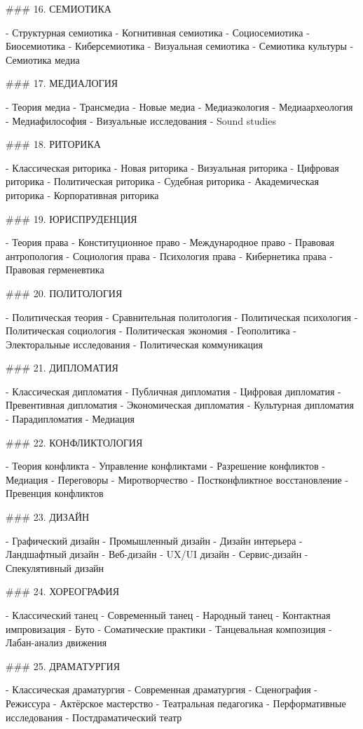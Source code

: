 ### 16. СЕМИОТИКА

- Структурная семиотика
- Когнитивная семиотика
- Социосемиотика
- Биосемиотика
- Киберсемиотика
- Визуальная семиотика
- Семиотика культуры
- Семиотика медиа

### 17. МЕДИАЛОГИЯ

- Теория медиа
- Трансмедиа
- Новые медиа
- Медиаэкология
- Медиаархеология
- Медиафилософия
- Визуальные исследования
- Sound studies

### 18. РИТОРИКА

- Классическая риторика
- Новая риторика
- Визуальная риторика
- Цифровая риторика
- Политическая риторика
- Судебная риторика
- Академическая риторика
- Корпоративная риторика

### 19. ЮРИСПРУДЕНЦИЯ

- Теория права
- Конституционное право
- Международное право
- Правовая антропология
- Социология права
- Психология права
- Кибернетика права
- Правовая герменевтика

### 20. ПОЛИТОЛОГИЯ

- Политическая теория
- Сравнительная политология
- Политическая психология
- Политическая социология
- Политическая экономия
- Геополитика
- Электоральные исследования
- Политическая коммуникация

### 21. ДИПЛОМАТИЯ

- Классическая дипломатия
- Публичная дипломатия
- Цифровая дипломатия
- Превентивная дипломатия
- Экономическая дипломатия
- Культурная дипломатия
- Парадипломатия
- Медиация

### 22. КОНФЛИКТОЛОГИЯ

- Теория конфликта
- Управление конфликтами
- Разрешение конфликтов
- Медиация
- Переговоры
- Миротворчество
- Постконфликтное восстановление
- Превенция конфликтов

### 23. ДИЗАЙН

- Графический дизайн
- Промышленный дизайн
- Дизайн интерьера
- Ландшафтный дизайн
- Веб-дизайн
- UX/UI дизайн
- Сервис-дизайн
- Спекулятивный дизайн

### 24. ХОРЕОГРАФИЯ

- Классический танец
- Современный танец
- Народный танец
- Контактная импровизация
- Буто
- Соматические практики
- Танцевальная композиция
- Лабан-анализ движения

### 25. ДРАМАТУРГИЯ

- Классическая драматургия
- Современная драматургия
- Сценография
- Режиссура
- Актёрское мастерство
- Театральная педагогика
- Перформативные исследования
- Постдраматический театр

